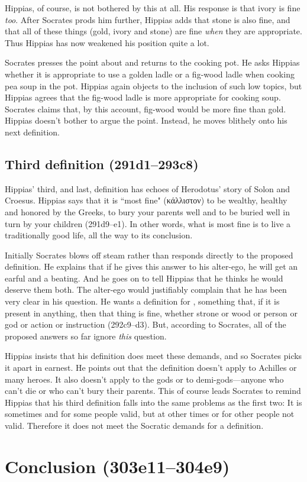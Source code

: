 \documentclass[11pt]{article}
\begin{document}
Hippias, of course, is not bothered by this at all.  His response is that ivory is fine \emph{too}.  After Socrates prods him further, Hippias adds that stone is also fine, and that all of these things (gold, ivory and stone) are fine \emph{when} they are appropriate.  Thus Hippias has now weakened his position quite a lot.

Socrates presses the point about  and returns to the cooking pot.  He asks Hippias whether it is appropriate to use a golden ladle or a fig-wood ladle when cooking pea soup in the pot.  Hippias again objects to the inclusion of such low topics, but Hippias agrees that the fig-wood ladle is more appropriate for cooking soup.  Socrates claims that, by this account, fig-wood would be more fine than gold.  Hippias doesn't bother to argue the point.  Instead, he moves blithely onto his next definition.


\subsection{Third definition (291d1--293c8)}

Hippias' third, and last, definition has echoes of Herodotus' story of Solon and Croesus.  Hippias says that it is ``most fine" (κάλλιστον) to be wealthy, healthy and honored by the Greeks, to bury your parents well and to be buried well in turn by your children (291d9--e1).  In other words, what is most fine is to live a traditionally good life, all the way to its conclusion.

Initially Socrates blows off steam rather than responds directly to the proposed definition.  He explains that if he gives this answer to his alter-ego, he will get an earful and a beating.  And he goes on to tell Hippias that he thinks he would deserve them both.  The alter-ego would justifiably complain that he has been very clear in his question. He wants a definition for , something that, if it is present in anything, then that thing is fine, whether strone or wood or person or god or action or instruction (292c9--d3).  But, according to Socrates, all of the proposed answers so far ignore \emph{this} question.

Hippias insists that his definition does meet these demands, and so Socrates picks it apart in earnest.  He points out that the definition doesn't apply to Achilles or many heroes.  It also doesn't apply to the gods or to demi-gods---anyone who can't die or who can't bury their parents.  This of course leads Socrates to remind Hippias that his third definition falls into the same problems as the first two: It is sometimes and for some people valid, but at other times or for other people not valid.  Therefore it does not meet the Socratic demands for a definition.


\section{Conclusion (303e11--304e9)}




\newpage


\end{document}
